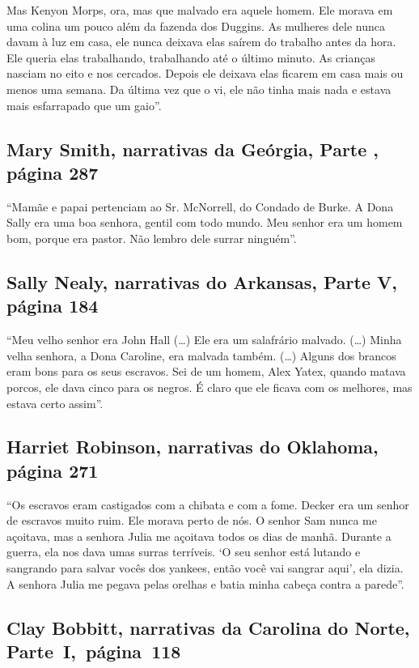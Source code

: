 Mas Kenyon Morps, ora, mas que malvado era aquele homem. Ele morava em
uma colina um pouco além da fazenda dos Duggins. As mulheres dele nunca
davam à luz em casa, ele nunca deixava elas saírem do trabalho antes da
hora. Ele queria elas trabalhando, trabalhando até o último minuto. As
crianças nasciam no eito e nos cercados. Depois ele deixava elas ficarem
em casa mais ou menos uma semana. Da última vez que o vi, ele não tinha
mais nada e estava mais esfarrapado que um gaio''.

\subsection{Mary Smith, narrativas da Geórgia, Parte , página 287}
\label{ref246}

``Mamãe e papai pertenciam ao Sr. McNorrell, do Condado de Burke. A Dona
Sally era uma boa senhora, gentil com todo mundo. Meu senhor era um
homem bom, porque era pastor. Não lembro dele surrar ninguém''.

\subsection{Sally Nealy, narrativas do Arkansas, Parte V, página 184}
\label{ref205}

``Meu velho senhor era John Hall (\ldots{}) Ele era um salafrário
malvado. (\ldots{}) Minha velha senhora, a Dona Caroline, era malvada
também. (\ldots{}) Alguns dos brancos eram bons para os seus escravos.
Sei de um homem, Alex Yatex, quando matava porcos, ele dava cinco para
os negros. É claro que ele ficava com os melhores, mas estava certo
assim''.

\subsection{Harriet Robinson, narrativas do Oklahoma, página 271}
\label{ref226}

``Os escravos eram castigados com a chibata e com a fome. Decker era um
senhor de escravos muito ruim. Ele morava perto de nós. O senhor Sam
nunca me açoitava, mas a senhora Julia me açoitava todos os dias de
manhã. Durante a guerra, ela nos dava umas surras terríveis. `O seu
senhor está lutando e sangrando para salvar vocês dos yankees, então
você vai sangrar aqui', ela dizia. A senhora Julia me pegava pelas
orelhas e batia minha cabeça contra a parede''.

\subsection{Clay Bobbitt, narrativas da Carolina do Norte, Parte~I,~página~118} \label{ref27}

